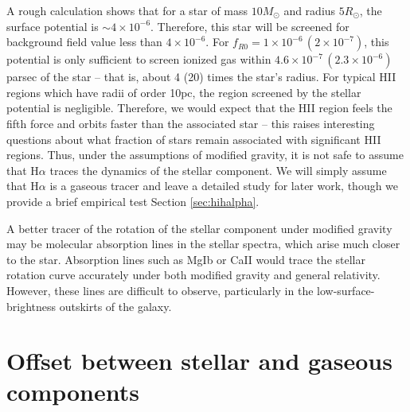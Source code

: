 \documentclass{emulateapj}
\newcommand{\ha}{H$\alpha$}
\begin{document}
A rough calculation shows that for a star of mass $10 M_\odot$ and radius
$5 R_\odot$, the surface potential is $\sim 4\times10^{-6}$. Therefore, this
star will be screened for background field value less than $4\times10^{-6}$.
For $f_{R0} = 1\times10^{-6}\,(2\times10^{-7})$, this potential is only
sufficient to screen ionized gas within
$4.6\times10^{-7}\,(2.3\times10^{-6})$ parsec of the star -- that is, about
4 (20) times the star's radius.
For typical HII regions which have radii of order 10pc, the region screened
by the stellar potential is negligible.  Therefore, we would expect  that the
HII region feels the fifth force and 
orbits faster than the associated star --
this raises interesting questions about what fraction of stars remain
associated with significant HII regions. Thus, under the assumptions of
modified gravity,  it is not safe to assume that \ha{}
traces the dynamics of the stellar component.
We will simply assume that \ha{} is a gaseous tracer and leave 
a detailed study for later work, though we provide a brief empirical
test Section \ref{sec:hihalpha}.

A better tracer of the rotation of the stellar component under modified gravity
may be molecular absorption lines in the stellar spectra, which arise much
closer to the star. Absorption lines such as MgIb or CaII would trace the
stellar rotation curve accurately under both modified gravity and general
relativity. However, these lines are difficult to observe, particularly
in the low-surface-brightness outskirts of the galaxy. 



\section{Offset between stellar and gaseous components}
\label{sec:offset}
\end{document}
